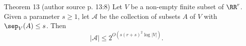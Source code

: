 \begin{originalresult}{Theorem 13 (author source p. 13:8)}
Let $V$ be a non-empty finite subset of $\RR^r$. Given a parameter $s\ge1$, let $\mathcal A$ be the collection of subsets $A$ of $V$ with $\sep_V(A)\le s$. Then
\[|\mathcal A|\le2^{O(s(r+s)^2\log|V|)}.\]
\end{originalresult}
